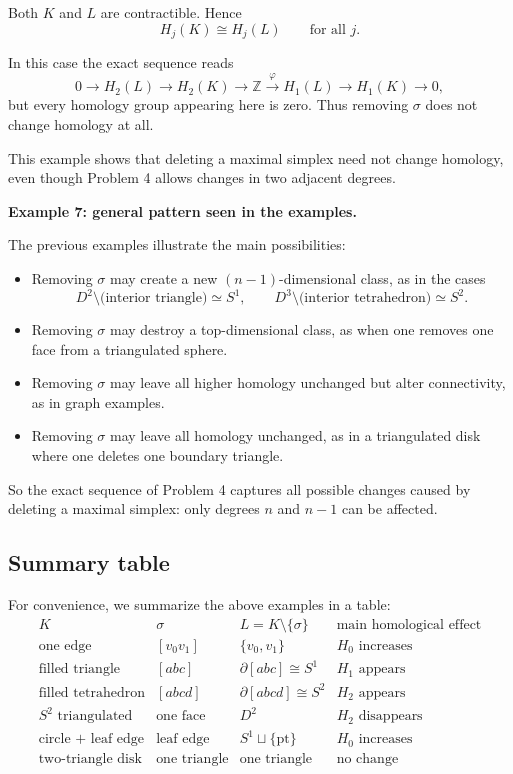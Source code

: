 \documentclass[12pt,a4paper]{article}
\theoremstyle{notespace}
\begin{document}
Both \(K\) and \(L\) are contractible. Hence
\[
H_j(K)\cong H_j(L)
\qquad\text{for all } j.
\]

In this case the exact sequence reads
\[
0\to H_2(L)\to H_2(K)\to \mathbb Z
\xrightarrow{\varphi}
H_1(L)\to H_1(K)\to 0,
\]
but every homology group appearing here is zero. Thus removing \(\sigma\) does not change homology at all.

This example shows that deleting a maximal simplex need not change homology, even though Problem 4 allows changes in two adjacent degrees.

\medskip

\textbf{Example 7: general pattern seen in the examples.}

The previous examples illustrate the main possibilities:

\begin{itemize}
	\item Removing \(\sigma\) may create a new \((n-1)\)-dimensional class, as in the cases
	\[
	D^2\setminus \text{(interior triangle)} \simeq S^1,
	\qquad
	D^3\setminus \text{(interior tetrahedron)} \simeq S^2.
	\]
	
	\item Removing \(\sigma\) may destroy a top-dimensional class, as when one removes one face from a triangulated sphere.
	
	\item Removing \(\sigma\) may leave all higher homology unchanged but alter connectivity, as in graph examples.
	
	\item Removing \(\sigma\) may leave all homology unchanged, as in a triangulated disk where one deletes one boundary triangle.
\end{itemize}

So the exact sequence of Problem 4 captures all possible changes caused by deleting a maximal simplex: only degrees \(n\) and \(n-1\) can be affected.

\subsection{Summary table}

For convenience, we summarize the above examples in a table:
\[
\begin{array}{c|c|c|c}
	K & \sigma & L=K\setminus\{\sigma\} & \text{main homological effect}\\
	\hline
	\text{one edge} & [v_0v_1] & \{v_0,v_1\} & H_0 \text{ increases}\\
	\text{filled triangle} & [abc] & \partial[abc]\cong S^1 & H_1 \text{ appears}\\
	\text{filled tetrahedron} & [abcd] & \partial[abcd]\cong S^2 & H_2 \text{ appears}\\
	S^2 \text{ triangulated} & \text{one face} & D^2 & H_2 \text{ disappears}\\
	\text{circle + leaf edge} & \text{leaf edge} & S^1\sqcup\{\text{pt}\} & H_0 \text{ increases}\\
	\text{two-triangle disk} & \text{one triangle} & \text{one triangle} & \text{no change}
\end{array}
\]
\end{document}
